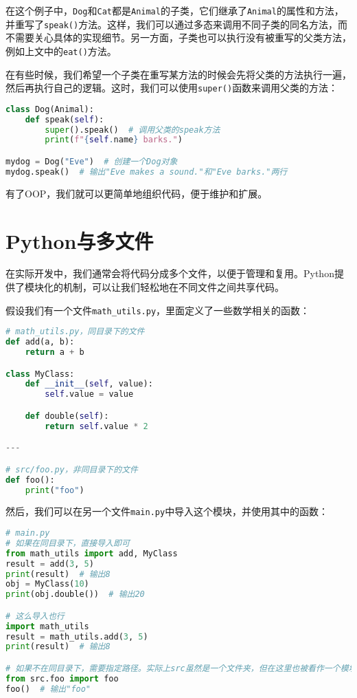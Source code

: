 在这个例子中，\texttt{Dog}和\texttt{Cat}都是\texttt{Animal}的子类，它们继承了\texttt{Animal}的属性和方法，并重写了\texttt{speak()}方法。这样，我们可以通过多态来调用不同子类的同名方法，而不需要关心具体的实现细节。另一方面，子类也可以执行没有被重写的父类方法，例如上文中的\texttt{eat()}方法。

在有些时候，我们希望一个子类在重写某方法的时候会先将父类的方法执行一遍，然后再执行自己的逻辑。这时，我们可以使用\texttt{super()}函数来调用父类的方法：
\begin{lstlisting}[language=python]
class Dog(Animal):
    def speak(self):
        super().speak()  # 调用父类的speak方法
        print(f"{self.name} barks.")

mydog = Dog("Eve")  # 创建一个Dog对象
mydog.speak()  # 输出"Eve makes a sound."和"Eve barks."两行
\end{lstlisting}

有了OOP，我们就可以更简单地组织代码，便于维护和扩展。

\section{Python与多文件}

在实际开发中，我们通常会将代码分成多个文件，以便于管理和复用。Python提供了模块化的机制，可以让我们轻松地在不同文件之间共享代码。

假设我们有一个文件\texttt{math\_utils.py}，里面定义了一些数学相关的函数：
\begin{lstlisting}[language=python]
# math_utils.py，同目录下的文件
def add(a, b):
    return a + b

class MyClass:
    def __init__(self, value):
        self.value = value

    def double(self):
        return self.value * 2

---

# src/foo.py，非同目录下的文件
def foo():
    print("foo")
\end{lstlisting}

然后，我们可以在另一个文件\texttt{main.py}中导入这个模块，并使用其中的函数：
\begin{lstlisting}[language=python]
# main.py
# 如果在同目录下，直接导入即可
from math_utils import add, MyClass
result = add(3, 5)
print(result)  # 输出8
obj = MyClass(10)
print(obj.double())  # 输出20

# 这么导入也行
import math_utils
result = math_utils.add(3, 5)
print(result)  # 输出8

# 如果不在同目录下，需要指定路径。实际上src虽然是一个文件夹，但在这里也被看作一个模块
from src.foo import foo 
foo()  # 输出"foo"
\end{lstlisting}

